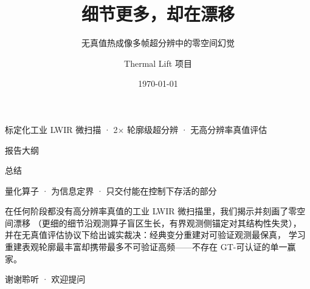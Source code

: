 \documentclass[aspectratio=169,10pt]{beamer}
\title[细节更多，却在漂移]{细节更多，却在漂移}
\subtitle{无真值热成像多帧超分辨中的零空间幻觉}
\author[Thermal Lift]{Thermal Lift 项目}
\date{\today}
\renewcommand{\textbf}[1]{#1}
\newcommand{\redflag}[1]{{\color{warmred}\textbf{#1}}}
\begin{document}
\begin{frame}[plain]
  \titlepage
  \begin{center}
    {\footnotesize\color{darkgray!80}标定化工业 LWIR 微扫描 · 2$\times$ 轮廓级超分辨 · 无高分辨率真值评估}
  \end{center}
\end{frame}

\begin{frame}{报告大纲}
  \tableofcontents
\end{frame}









\begin{frame}[plain]{总结}
  \vfill
  \begin{center}
    {\large\color{cvprblue}\textbf{量化算子 · 为信息定界 · 只交付能在控制下存活的部分}}
  \end{center}
  \vspace{1em}
  \begin{center}
    \begin{minipage}{0.86\textwidth}
      \color{darkgray}
      在任何阶段都没有高分辨率真值的工业 LWIR 微扫描里，我们\textbf{揭示并刻画了零空间漂移}
      （更细的细节沿观测算子盲区生长，有界观测侧锚定对其结构性失灵），
      并在无真值评估协议下给出\textbf{诚实裁决}：经典变分重建对可验证观测最保真，
      学习重建表观轮廓最丰富却携带最多不可验证高频——\redflag{不存在 GT-可认证的单一赢家}。
    \end{minipage}
  \end{center}
  \vfill
  \begin{center}
    {\footnotesize\color{darkgray!70}谢谢聆听 · 欢迎提问}
  \end{center}
  \vfill
\end{frame}
\end{document}

